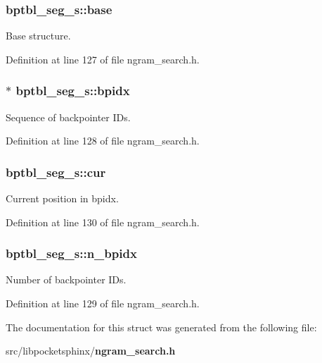 \subsubsection[{base}]{ {\bf bptbl\-\_\-seg\-\_\-s\-::base}}\label{structbptbl__seg__s_ac21f715b189c7e452385252bfcee47fe}


\-Base structure. 



\-Definition at line 127 of file ngram\-\_\-search.\-h.

\subsubsection[{bpidx}]{$\ast$ {\bf bptbl\-\_\-seg\-\_\-s\-::bpidx}}\label{structbptbl__seg__s_a81e3d422fb2307c1a83e9490525dce7f}


\-Sequence of backpointer \-I\-Ds. 



\-Definition at line 128 of file ngram\-\_\-search.\-h.

\subsubsection[{cur}]{ {\bf bptbl\-\_\-seg\-\_\-s\-::cur}}\label{structbptbl__seg__s_a1649196a2c03fb61b31624086ee998b5}


\-Current position in bpidx. 



\-Definition at line 130 of file ngram\-\_\-search.\-h.

\subsubsection[{n\-\_\-bpidx}]{ {\bf bptbl\-\_\-seg\-\_\-s\-::n\-\_\-bpidx}}\label{structbptbl__seg__s_a8d1f0aa7dd09e2d6321a00b68ab6a051}


\-Number of backpointer \-I\-Ds. 



\-Definition at line 129 of file ngram\-\_\-search.\-h.



\-The documentation for this struct was generated from the following file\-:\begin{DoxyCompactItemize}
\item 
src/libpocketsphinx/{\bf ngram\-\_\-search.\-h}\end{DoxyCompactItemize}
